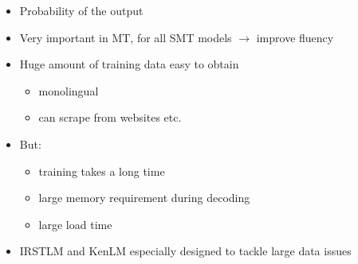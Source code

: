 \documentclass[landscape]{uedslides2C}
\begin{document}
\begin{itemize} \itemsep -1mm
\item Probability of the output 
\item Very important in MT, for all SMT models $\rightarrow$ improve fluency
\item Huge amount of training data easy to obtain
	\begin{itemize}
	\item monolingual
	\item can scrape from websites etc.
	\end{itemize}
\item But:
	\begin{itemize}
	\item training takes a long time
	\item large memory requirement during decoding
	\item large load time
	\end{itemize}
\item IRSTLM and KenLM especially designed to tackle large data issues
\end{itemize}

%
%
%   
%
%  
%  
  
\end{document}
